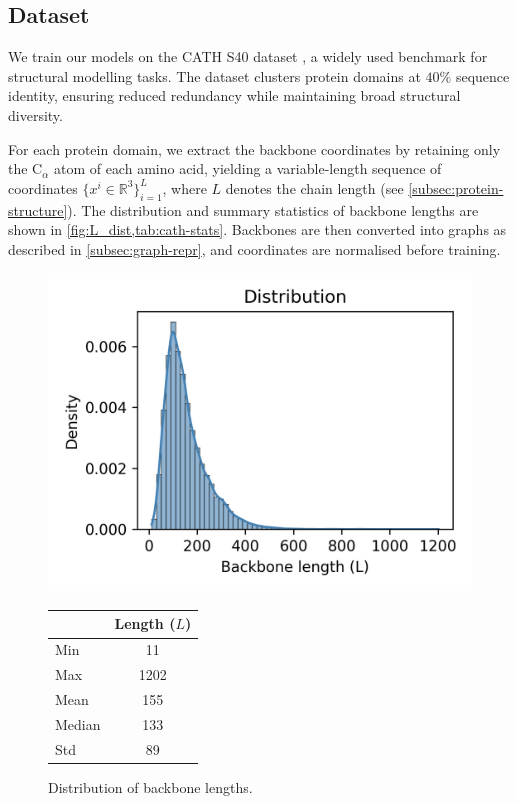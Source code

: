 \documentclass[a4paper,12pt]{article}
\begin{document}
\subsection{Dataset}\label{subsec:dataset}
We train our models on the CATH S40 dataset \citep{orengo1997CATHHierarchicClassification,waman2024CATH2024CATHAlphaFlow,sillitoe2021CATHIncreasedStructural,lewis2018Gene3DExtensivePrediction}, a widely used benchmark for structural modelling tasks. The dataset clusters protein domains at \(40\%\) sequence identity, ensuring reduced redundancy while maintaining broad structural diversity. 

For each protein domain, we extract the backbone coordinates by retaining only the C\(_\alpha\) atom of each amino acid, yielding a variable-length sequence of coordinates \(\{x^i \in \mathbb{R}^3\}_{i=1}^L\), where \(L\) denotes the chain length (see \cref{subsec:protein-structure}). The distribution and summary statistics of backbone lengths are shown in \cref{fig:L_dist,tab:cath-stats}. Backbones are then converted into graphs as described in \cref{subsec:graph-repr}, and coordinates are normalised before training.

\begin{figure}[htbp]
  \centering
  \begin{minipage}[c]{0.58\linewidth}
    \centering
    \includegraphics[width=\linewidth]{backbone_length_dist.png}
    \caption{Distribution of backbone lengths.}
    \label{fig:L_dist}
  \end{minipage}%
  \hfill
  \begin{minipage}[c]{0.35\linewidth}
    \centering
    \begin{tabular}{lc}
      \toprule
      & Length (\(L\)) \\
      \midrule
      Min & 11 \\
      Max & 1202 \\
      Mean & 155 \\
      Median & 133 \\
      Std & 89 \\
      \bottomrule
    \end{tabular}
    \label{tab:cath-stats}
  \end{minipage}
\end{figure}
\end{document}
